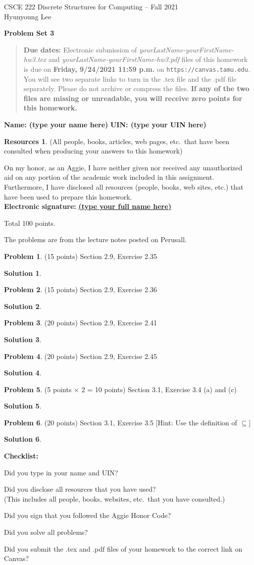\documentclass{article}
\theoremstyle{definition}
\newtheorem{problem}{Problem}
\newtheorem*{solution}{Solution}
\newtheorem*{resources}{Resources}
\newcommand{\name}[2]{\noindent\textbf{Name: #1}\hfill \textbf{UIN: #2}}
\newcommand{\honor}{\noindent On my honor, as an Aggie, I have neither
  given nor received any unauthorized aid on any portion of the
  academic work included in this assignment. Furthermore, I have
  disclosed all resources (people, books, web sites, etc.) that have
  been used to prepare this homework. \\[2ex]
 \textbf{Electronic signature:} \underline{ \textbf{(type your full name here)} } }
\newcommand{\checklist}{\noindent\textbf{Checklist:}
\begin{compactitem}[$\Box$] 
\item Did you type in your name and UIN? 
\item Did you disclose all resources that you have used? \\
(This includes all people, books, websites, etc.\ that you have consulted.)
\item Did you sign that you followed the Aggie Honor Code? 
\item Did you solve all problems? 
\item Did you submit the .tex and .pdf files of your homework to the correct link on Canvas? 
\end{compactitem}
}
\newcommand{\problemset}[1]{\begin{center}\textbf{Problem Set #1}\end{center}}
\newcommand{\duedate}[1]{\begin{quote}\textbf{Due dates:} Electronic
    submission of \textsl{yourLastName-yourFirstName-hw3.tex} and 
    \textsl{yourLastName-yourFirstName-hw3.pdf} files of this homework is due on
    \textbf{#1} on \texttt{https://canvas.tamu.edu}. You will see two separate links
    to turn in the .tex file and the .pdf file separately. Please do not archive or compress the files.  
    \textbf{If any of the two files are missing or unreadable, you will receive zero points for this
    homework.}\end{quote} }
\begin{document}
\vspace*{-20mm}
\begin{center}
{\large
CSCE 222 Discrete Structures for Computing -- Fall 2021\\[.5ex]
Hyunyoung Lee\\}
\end{center}
\problemset{3}
\duedate{Friday, 9/24/2021 11:59 p.m.}
\name{ (type your name here) }{ (type your UIN here) }
\begin{resources} (All people, books, articles, web pages, etc.\ that
  have been consulted when producing your answers to this homework)
\end{resources}
\honor

\bigskip

\noindent
Total 100 points.

\bigskip

\noindent
The problems are from the lecture notes posted on Perusall.

\medskip

\begin{problem} (15 points) Section 2.9, Exercise 2.35 
\end{problem}
\begin{solution} 
\end{solution}

\begin{problem} (15 points) Section 2.9, Exercise 2.36
\end{problem}
\begin{solution} 
\end{solution}

\begin{problem} (20 points) Section 2.9, Exercise 2.41
\end{problem}
\begin{solution} 
\end{solution}

\begin{problem} (20 points) Section 2.9, Exercise 2.45
\end{problem}
\begin{solution} 
\end{solution}

\begin{problem} (5 points $\times$ 2 = 10 points) Section 3.1, Exercise 3.4 (a) and (c) 
\end{problem}
\begin{solution} 
\end{solution}

\begin{problem} (20 points) Section 3.1, Exercise 3.5 [Hint: Use the definition of $\subseteq$]
\end{problem}
\begin{solution} 
\end{solution}

\goodbreak
\checklist
\end{document}
